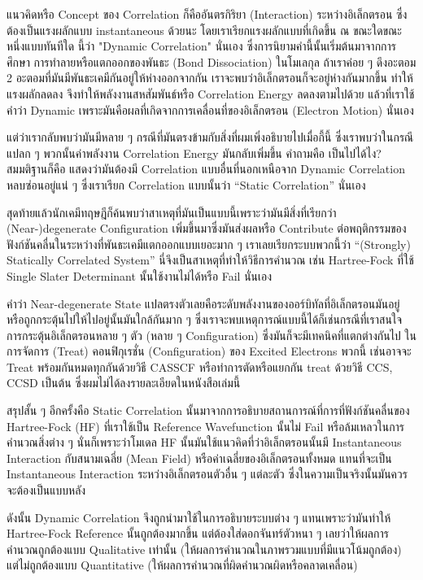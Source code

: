 แนวคิดหรือ Concept ของ Correlation ก็คืออันตรกิริยา (Interaction) ระหว่างอิเล็กตรอน ซึ่งต้องเป็นแรงผลักแบบ instantaneous ด้วยนะ
โดยเราเรียกแรงผลักแบบที่เกิดขึ้น ณ ขณะใดขณะหนึ่งแบบทันทีใด นี้ว่า "Dynamic Correlation" นั่นเอง ซึ่งการนิยามคำนี้นั้นเริ่มต้นมาจากการศึกษา%
การทำลายหรือแตกออกของพันธะ (Bond Dissociation) ในโมเลกุล ถ้าเราค่อย ๆ ดึงอะตอม 2 อะตอมที่มันมีพันธะเคมีกันอยู่ให้ห่างออกจากกัน
เราจะพบว่าอิเล็กตรอนก็จะอยู่ห่างกันมากขึ้น ทำให้แรงผลักลดลง จึงทำให้พลังงานสหสัมพันธ์หรือ Correlation Energy ลดลงตามไปด้วย แล้วที่เราใช้คำว่า
Dynamic เพราะมันคือผลที่เกิดจากการเคลื่อนที่ของอิเล็กตรอน (Electron Motion) นั่นเอง

แต่ว่าเรากลับพบว่ามันมีหลาย ๆ กรณีที่มันตรงข้ามกับสิ่งที่ผมเพิ่งอธิบายไปเมื่อกี้นี้ ซึ่งเราพบว่าในกรณีแปลก ๆ พวกนั้นค่าพลังงาน Correlation Energy
มันกลับเพิ่มขึ้น คำถามคือ เป็นไปได้ไง? สมมติฐานก็คือ แสดงว่ามันต้องมี Correlation แบบอื่นที่นอกเหนือจาก Dynamic Correlation หลบซ่อนอยู่แน่ ๆ
ซึ่งเราเรียก Correlation แบบนั้นว่า \enquote{Static Correlation} นั่นเอง

สุดท้ายแล้วนักเคมีทฤษฎีก็ค้นพบว่าสาเหตุที่มันเป็นแบบนี้เพราะว่ามันมีสิ่งที่เรียกว่า (Near-)degenerate Configuration เพิ่มขึ้นมาซึ่งมันส่งผลหรือ
Contribute ต่อพฤติกรรมของฟังก์ชันคลื่นในระหว่างที่พันธะเคมีแตกออกแบบเยอะมาก ๆ เราเลยเรียกระบบพวกนี้ว่า \enquote{(Strongly) Statically
    Correlated System} นี่จึงเป็นสาเหตุที่ทำให้วิธีการคำนวณ เช่น Hartree-Fock ที่ใช้ Single Slater Determinant นั้นใช้งานไม่ได้หรือ
Fail นั่นเอง

คำว่า Near-degenerate State แปลตรงตัวเลยคือระดับพลังงานของออร์บิทัลที่อิเล็กตรอนมันอยู่หรือถูกกระตุ้นไปให้ไปอยู่นั้นมันใกล้กันมาก ๆ
ซึ่งเราจะพบเหตุการณ์แบบนี้ได้ก็เช่นกรณีที่เราสนใจการกระตุ้นอิเล็กตรอนหลาย ๆ ตัว (หลาย ๆ Configuration) ซึ่งมันก็จะมีเทคนิคที่แตกต่างกันไป%
ในการจัดการ (Treat) คอนฟิกุเรชั่น (Configuration) ของ Excited Electrons พวกนี้ เช่นอาจจะ Treat พร้อมกันหมดทุกกันด้วยวิธี CASSCF
หรือทำการตัดหรือแยกกัน treat ด้วยวิธี CCS, CCSD เป็นต้น ซึ่งผมไม่ได้ลงรายละเอียดในหนังสือเล่มนี้

สรุปสั้น ๆ อีกครั้งคือ Static Correlation นั้นมาจากการอธิบายสถานการณ์ที่การที่ฟังก์ชันคลื่นของ Hartree-Fock (HF) ที่เราใช้เป็น Reference
Wavefunction นั้นไม่ Fail หรือล้มเหลวในการคำนวณสิ่งต่าง ๆ นั่นก็เพราะว่าโมเดล HF นั้นมันใช้แนวคิดที่ว่าอิเล็กตรอนนั้นมี Instantaneous
Interaction กับสนามเฉลี่ย (Mean Field) หรือค่าเฉลี่ยของอิเล็กตรอนทั้งหมด แทนที่จะเป็น Instantaneous Interaction
ระหว่างอิเล็กตรอนตัวอื่น ๆ แต่ละตัว ซึ่งในความเป็นจริงนั้นมันควรจะต้องเป็นแบบหลัง

ดังนั้น Dynamic Correlation จึงถูกนำมาใช้ในการอธิบายระบบต่าง ๆ แทนเพราะว่ามันทำให้ Hartree-Fock Reference นั้นถูกต้องมากขึ้น
แต่ต้องใส่ดอกจันทร์ตัวหนา ๆ เลยว่าให้ผลการคำนวณถูกต้องแบบ Qualitative เท่านั้น (ให้ผลการคำนวณในภาพรวมแบบที่มีแนวโน้มถูกต้อง)
แต่ไม่ถูกต้องแบบ Quantitative (ให้ผลการคำนวณที่ผิดคำนวณผิดหรือคลาดเคลื่อน)


